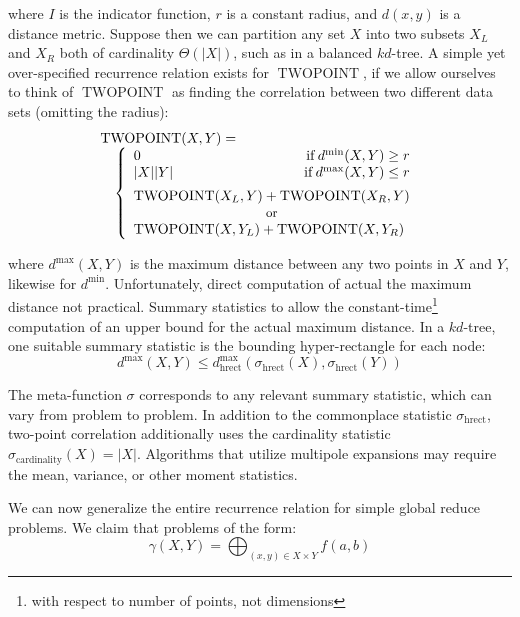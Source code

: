 \documentclass[times, 10pt,twocolumn]{article}
\DeclareMathOperator{\TWOPT}{TWOPOINT}
\DeclareMathOperator{\cardinality}{cardinality}
\DeclareMathOperator{\hrect}{hrect}
\DeclareMathOperator{\IF}{if}
\newcommand{\allsigma}{\sigma}
\begin{document}
\noindent where $I$ is the indicator function, $r$ is a constant radius, and $d(x, y)$ is a distance metric.
Suppose then we can partition any set $X$ into two subsets $X_L$ and $X_R$ both of cardinality $\Theta(|X|)$, such as in a balanced $kd$-tree.
A simple yet over-specified recurrence relation exists for $\TWOPT$, if we allow ourselves to think of $\TWOPT$ as finding the correlation between two different data sets (omitting the radius):
\begin{equation}
 \begin{array}{ll}
  \lefteqn{\TWOPT(X, Y) =}
  \\
  & \left\{
    \begin{array}{lr}
      0 & \IF d^{\min}(X, Y) \geq r
      \\
      |X||Y| & \IF d^{\max}(X, Y) \leq r
      \vspace{0.07in}
      \\
      \multicolumn{2}{l}{\TWOPT(X_L, Y) + \TWOPT(X_R, Y)}
      \\
      \multicolumn{2}{c}{\scriptstyle{\mbox{\small{or}}}}
      \\
      \multicolumn{2}{l}{\TWOPT(X, Y_L) + \TWOPT(X, Y_R)}
    \end{array}
  \right.
 \end{array}
\end{equation}

\noindent where $d^{\max}(X, Y)$ is the maximum distance between any two points in $X$ and $Y$, likewise for $d^{\min}$.
Unfortunately, direct computation of actual the maximum distance not practical.
Summary statistics to allow the constant-time\footnote{with respect to number of points, not dimensions} computation of an upper bound for the actual maximum distance.
In a $kd$-tree, one suitable summary statistic is the bounding hyper-rectangle for each node:
\begin{equation}
d^{\max}(X, Y) \leq d^{\max}_{\hrect}(\allsigma_{\hrect}(X), \allsigma_{\hrect}(Y))
\end{equation}

\noindent The meta-function $\allsigma$ corresponds to any relevant summary statistic, which can vary from problem to problem.
In addition to the commonplace statistic $\allsigma_{\hrect}$, two-point correlation additionally uses the cardinality statistic $\allsigma_{\cardinality}(X) = |X|$.
Algorithms that utilize multipole expansions may require the mean, variance, or other moment statistics.

We can now generalize the entire recurrence relation for simple global reduce problems.
We claim that problems of the form:
\begin{equation}
  \gamma(X, Y) = \bigoplus_{(x, y) \in X \times Y} f(a,b)
\end{equation}
\end{document}
